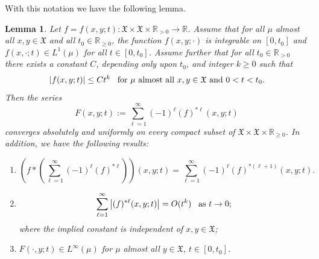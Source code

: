 \documentclass[11pt,reqno]{amsart}
\newtheorem{lemma}[theorem]{Lemma}
\theoremstyle{remark}
\theoremstyle{definition}
\numberwithin{theorem}{section} \numberwithin{equation}{section}
\newcommand{\X}{\mathfrak{X}}
\begin{document}
With this notation we have the following lemma.

\begin{lemma}
\label{lem:convergence of the series} Let $f=f(x,y;t):\X\times \X\times\mathbb{R}_{>0}\to\mathbb{R}$.
Assume that for all $\mu$ almost all $x,y\in \X$ and all $t_{0} \in \mathbb{R}_{\geq0}$, the function $f(x,y;\cdot)$ is integrable on
 $[0,t_{0}]$ and $f(x,\cdot;t) \in L^1(\mu)$ for all $t\in [0,t_0]$.
Assume further that for all $t_{0} \in \mathbb{R}_{>0}$ there exists a constant $C$, depending only upon $t_0$, and integer $k\geq 0$ such that
$$
|f(x,y;t)|\leq Ct^{k}
\,\,\,\,\,
\text{\rm for $\mu$ almost all $x,y\in \X$ and $0<t<t_{0}$.}
$$
Then the series
\begin{equation}\label{eq: series over ell}
F(x,y;t):=\sum_{\ell=1}^{\infty}(-1)^{\ell}(f)^{\ast\ell}(x,y;t)
\end{equation}
converges absolutely and uniformly on every compact subset of $\X\times \X\times\mathbb{R}_{\geq0}$.
In addition, we have the following results:
\begin{enumerate}
\item \begin{equation}
\left(f\ast\left(\sum_{\ell=1}^{\infty}(-1)^{\ell}(f)^{\ast\ell}\right)\right)(x,y;t)=
\sum_{\ell=1}^{\infty}(-1)^{\ell}(f)^{\ast(\ell+1)}(x,y;t).\label{eq: convolution with inf sum}
\end{equation}
\item
\begin{equation}\label{eq:series_bound}
\sum_{\ell=1}^{\infty}\left|(f)^{\ast\ell}(x,y;t)\right|
=O(t^{k})
\,\,\,\,\,
\text{\rm as $t\to 0$;}
\end{equation}
where the implied constant is independent of $x,y\in \X$;
\item
    $F(\cdot,y;t)\in L^\infty(\mu)$ for $\mu$ almost all $y\in\X$, $t\in[0,t_0]$.
\end{enumerate}
\end{lemma}
\end{document}
